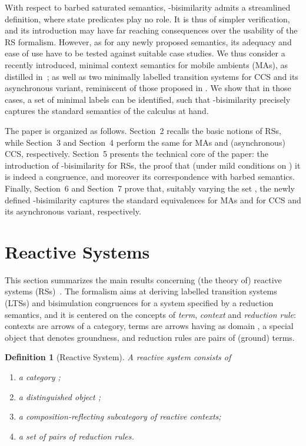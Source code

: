 \documentclass[copyright,creativecommons]{eptcs}
\newcommand{\<}{\langle}
\renewcommand{\>}{\rangle}
\newtheorem{definition}{Definition}{}
\begin{document}
With respect to barbed saturated semantics, -bisimilarity admits a
streamlined definition, where state predicates play no role. It is
thus of simpler verification, and its introduction may have far
reaching consequences over the usability of the RS formalism. However,
as for any newly proposed semantics, its adequacy and ease of use have
to be tested against suitable case studies. We thus consider a recently
introduced, minimal context semantics for mobile ambients (MAs), as distilled
in~\cite{BoGaMo}; as well as two minimally labelled transition systems
for CCS and its asynchronous variant, reminiscent of those proposed in
\cite{bgk:bisimulation-graph-enc}. We show that in those cases, a set
 of minimal labels can be identified, such that -bisimilarity
precisely captures the standard semantics of the calculus at hand.

The paper is organized as follows. Section~2 recalls the basic notions
of RSs, while Section~3 and Section~4 perform the same for MAs and
(asynchronous) CCS, respectively. Section~5 presents the technical
core of the paper: the introduction of -bisimilarity for RSs, the
proof that (under mild conditions on ) it is indeed a congruence,
and moreover its correspondence with barbed semantics.  Finally,
Section~6 and Section~7 prove that, suitably varying the set , the
newly defined -bisimilarity captures the standard equivalences for
MAs and for CCS and its asynchronous variant, respectively.



\section{Reactive Systems}\label{sec:Rea}

This section summarizes the main results concerning (the theory of)
reactive systems (RSs)~\cite{DBLP:conf/concur/LeiferM00}.  The
formalism aims at deriving labelled transition systems (LTSs) and
bisimulation congruences for a system specified by a reduction
semantics, and it is centered on the concepts of \emph{term},
\emph{context} and \emph{reduction rule}: contexts are arrows of a
category, terms are arrows having as domain , a special object that
denotes groundness, and reduction rules are pairs of (ground) terms.

\begin{definition}[Reactive System] A \emph{reactive system} 
  consists of
  \begin{enumerate}
    \setlength{\itemsep}{0cm}
  \item a category ;
  \item a distinguished object ;
  \item a composition-reflecting subcategory  of
    \emph{reactive contexts};
  \item a set of pairs  of \emph{reduction rules}.
  \end{enumerate}
\end{definition}
\end{document}
